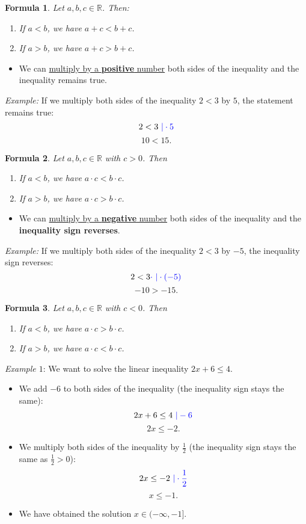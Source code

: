\documentclass[12pt]{article}
\newtheorem{formula}{Formula}[section]
\begin{document}
\begin{formula}
Let $a,b, c\in \mathbb{R}$. Then:
\begin{enumerate}
\item[(i)] If $a<b$, we have $a+c<b+c$.
\item[(ii)] If $a>b$, we have $a+c>b+c$.
\end{enumerate}
\end{formula}

\begin{itemize}
\item We can \underline{multiply by a \textbf{positive} number} both sides of the inequality and the inequality remains true.
\end{itemize}

\textit{Example:} If we multiply both sides of the inequality $2<3$ by $5$, the statement remains true:
$$2<3 \textcolor{blue}{\ |\cdot 5}$$
$$10<15.$$

\begin{formula}
Let $a,b, c\in \mathbb{R}$ with $c>0$. Then
\begin{enumerate}
\item[(i)] If $a<b$, we have $a\cdot c<b\cdot c$.
\item[(ii)] If $a>b$, we have $a\cdot c>b\cdot c$.
\end{enumerate}
\end{formula}

\begin{itemize}
\item We can \underline{multiply by a \textbf{negative} number} both sides of the inequality and the \textbf{inequality sign reverses}.
\end{itemize}

\textit{Example:} If we multiply both sides of the inequality $2<3$ by $-5$, the inequality sign reverses:
$$2<3 \textcolor{blue}{\cdot \ | \cdot(-5)}$$
$$-10>-15.$$

\begin{formula}
Let $a,b, c\in \mathbb{R}$ with $c<0$. Then
\begin{enumerate}
\item[(i)] If $a<b$, we have $a\cdot c>b\cdot c $.
\item[(ii)] If $a>b$, we have $a\cdot c<b\cdot c$.
\end{enumerate}
\end{formula}

\textit{Example $1$}: We want to solve the linear inequality $2x+6\leq 4$.
\begin{itemize}
\item We add $-6$ to both sides of the inequality (the inequality sign stays the same):
$$2x+6\leq 4 \textcolor{blue}{\ |-6}$$
$$2x\leq -2.$$
\item We multiply both sides of the inequality by $\frac{1}{2}$ (the inequality sign stays the same as $\frac{1}{2}>0$):
$$2x\leq -2 \textcolor{blue}{\ |\cdot \frac{1}{2}}$$
$$x\leq -1.$$
\item We have obtained the solution $x\in (-\infty, -1]$.
\end{itemize}
\end{document}

